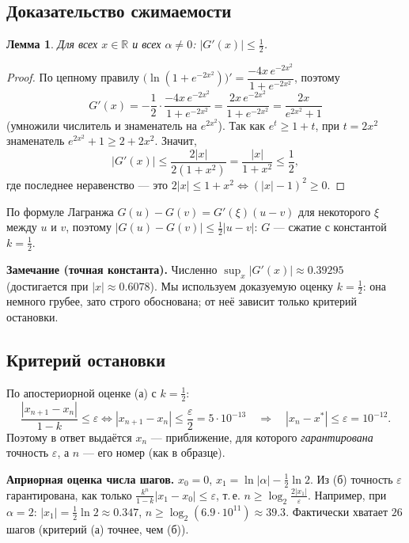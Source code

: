 \documentclass[11pt,a4paper]{article}
\newtheorem{lemma}{Лемма}
\begin{document}
\subsection{Доказательство сжимаемости}
\begin{lemma}
Для всех $x\in\mathbb R$ и всех $\alpha\ne0$: \quad $|G'(x)|\le\frac12$.
\end{lemma}
\begin{proof}
По цепному правилу $\bigl(\ln(1+e^{-2x^2})\bigr)'=\dfrac{-4x\,e^{-2x^2}}{1+e^{-2x^2}}$, поэтому
\[
G'(x)=-\frac12\cdot\frac{-4x\,e^{-2x^2}}{1+e^{-2x^2}}=\frac{2x\,e^{-2x^2}}{1+e^{-2x^2}}
=\frac{2x}{e^{2x^2}+1}
\]
(умножили числитель и знаменатель на $e^{2x^2}$). Так как $e^t\ge1+t$, при $t=2x^2$ знаменатель $e^{2x^2}+1\ge2+2x^2$. Значит,
\[
|G'(x)|\le\frac{2|x|}{2(1+x^2)}=\frac{|x|}{1+x^2}\le\frac12,
\]
где последнее неравенство — это $2|x|\le1+x^2\iff(|x|-1)^2\ge0$.
\end{proof}
По формуле Лагранжа $G(u)-G(v)=G'(\xi)(u-v)$ для некоторого $\xi$ между $u$ и $v$, поэтому
$|G(u)-G(v)|\le\frac12|u-v|$: $G$ — сжатие с константой $k=\frac12$.

\textbf{Замечание (точная константа).} Численно $\sup_x|G'(x)|\approx0.39295$ (достигается при $|x|\approx0.6078$).
Мы используем доказуемую оценку $k=\frac12$: она немного грубее, зато строго обоснована; от неё зависит только критерий остановки.

\subsection{Критерий остановки}
По апостериорной оценке (а) с $k=\frac12$:
\[
\frac{|x_{n+1}-x_n|}{1-k}\le\varepsilon\iff|x_{n+1}-x_n|\le\frac{\varepsilon}{2}=5\cdot10^{-13}\quad\Longrightarrow\quad|x_n-x^*|\le\varepsilon=10^{-12}.
\]
Поэтому в ответ выдаётся $x_n$ — приближение, для которого \emph{гарантирована} точность $\varepsilon$, а $n$ — его номер (как в образце).

\textbf{Априорная оценка числа шагов.} $x_0=0$, $x_1=\ln|\alpha|-\frac12\ln2$. Из (б) точность $\varepsilon$ гарантирована, как только
$\frac{k^n}{1-k}|x_1-x_0|\le\varepsilon$, т.\,е. $n\ge\log_2\frac{2|x_1|}{\varepsilon}$. Например, при $\alpha=2$: $|x_1|=\frac12\ln2\approx0.347$,
$n\ge\log_2(6.9\cdot10^{11})\approx39.3$. Фактически хватает $26$ шагов (критерий (а) точнее, чем (б)).
\end{document}
